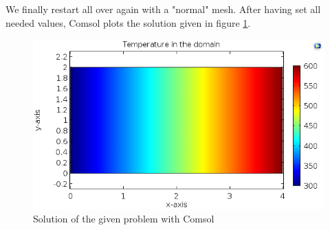 We finally restart all over again with a "normal" mesh. After having set all needed values, Comsol plots the solution given in figure \ref{rect}.


\begin{figure}
\begin{center}
\includegraphics[scale=0.6]{laplaceRect.png}
\caption{Solution of the given problem with Comsol}
\label{rect}
\end{center}
\end{figure}